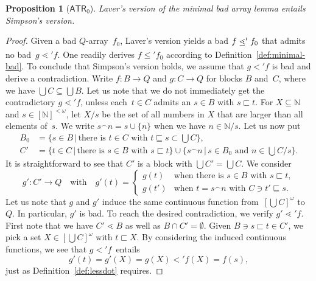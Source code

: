 \documentclass{amsart}
\numberwithin{theorem}{section}
\newtheorem{proposition}[theorem]{Proposition}
\theoremstyle{definition}
\newcommand\ledot{\mathrel{\ensurestackMath{%
  \stackengine{-.5ex}{\lessdot}{-}{U}{c}{F}{F}{S}}}}
\begin{document}
\begin{proposition}[$\mathsf{ATR}_0$]\label{prop:laver-to-simpson}
Laver's version of the minimal bad array lemma entails Simpson's version.
\end{proposition}
\begin{proof}  
Given a bad $Q$-array~$f_0$, Laver's version yields a bad $f\ledot' f_0$ that admits no bad~$g\lessdot' f$.  One readily derives $f\leq' f_0$ according to Definition~\ref{def:minimal-bad}. To conclude that Simpson's version holds, we assume that $g<' f$ is bad and derive a contradiction. Write $f:B\to Q$ and $g:C\to Q$ for blocks $B$ and~$C$, where we have $\bigcup C\subseteq\bigcup B$. Let us note that we do not immediately get the contradictory $g\lessdot' f$, unless each~$t\in C$ admits an $s\in B$ with $s\sqsubset t$. For $X\subseteq\mathbb N$ and $s\in[\mathbb N]^{<\omega}$, let $X/s$ be the set of all numbers in $X$ that are larger than all elements of~$s$. We write $s^\frown n=s\cup\{n\}$ when we have $n\in\mathbb N/s$. Let us now put
\begin{align*}
B_0&=\{s\in B\,|\,\text{there is $t\in C$ with $t\sqsubseteq s\subset\textstyle\bigcup C$}\},\\
C'&=\{t\in C\,|\,\text{there is $s\in B$ with $s\sqsubset t$}\}\cup\{s^\frown n\,|\,s\in B_0\text{ and }n\in{\textstyle\bigcup C}/s\}.
\end{align*}
It is straightforward to see that $C'$ is a block with $\bigcup C'=\bigcup C$. We consider
\begin{equation*}
g':C'\to Q\quad\text{with}\quad g'(t)=\begin{cases}
g(t) & \text{when there is $s\in B$ with $s\sqsubset t$},\\
g(t') & \text{when $t=s^\frown n$ with $C\ni t'\sqsubseteq s$}.
\end{cases}
\end{equation*}
Let us note that $g$ and $g'$ induce the same continuous function from~$[{\bigcup C}]^\omega$ to~$Q$. In particular, $g'$ is bad. To reach the desired contradiction, we verify $g'\lessdot' f$. First note that we have $C'\lessdot B$ as well as $B\cap C'=\emptyset$. Given $B\ni s\sqsubset t\in C'$, we pick a set $X\in[{\bigcup C}]^\omega$ with $t\sqsubset X$. By considering the induced continuous functions, we see that $g<' f$~entails
\begin{equation*}
g'(t)=g'(X)=g(X)<'f(X)=f(s),
\end{equation*}
just as Definition~\ref{def:lessdot} requires.
\end{proof}
\end{document}
